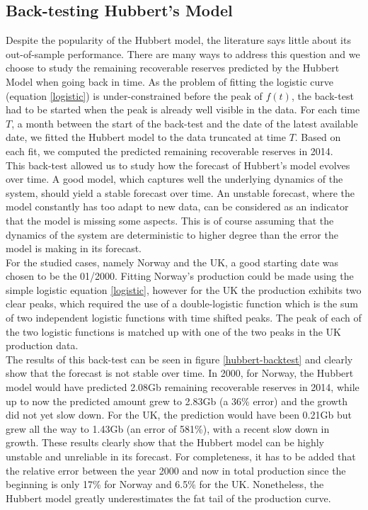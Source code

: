 \documentclass[review]{elsarticle}
\begin{document}
\subsection{Back-testing Hubbert's Model}

Despite the popularity of the Hubbert model, the literature says little about its out-of-sample performance. There are many ways to address this question and we choose to study the remaining recoverable reserves predicted by the Hubbert Model when going back in time. As the problem of fitting the logistic curve (equation \ref{logistic}) is under-constrained before the peak of $f(t)$, the back-test had to be started when the peak is already well visible in the data. For each time $T$, a month between the start of the back-test and the date of the latest available date, we fitted the Hubbert model to the data truncated at time $T$. Based on each fit, we computed the predicted remaining recoverable reserves in 2014.\\
This back-test allowed us to study how the forecast of Hubbert's model evolves over time. A good model, which captures well the underlying dynamics of the system, should yield a stable forecast over time. An unstable forecast, where the model constantly has too adapt to new data, can be considered as an indicator that the model is missing some aspects. This is of course assuming that the dynamics of the system are deterministic to higher degree than the error the model is making in its forecast.\\
For the studied cases, namely Norway and the UK, a good starting date was chosen to be the 01/2000. Fitting Norway's production could be made using the simple logistic equation \ref{logistic}, however for the UK the production exhibits two clear peaks, which required the use of a double-logistic function which is the sum of two independent logistic functions with time shifted peaks. The peak of each of the two logistic functions is matched up with one of the two peaks in the UK production data.\\
The results of this back-test can be seen in figure \ref{hubbert-backtest} and clearly show that the forecast is not stable over time. In 2000, for Norway, the Hubbert model would have predicted 2.08Gb remaining recoverable reserves in 2014, while up to now the predicted amount grew to 2.83Gb (a 36\% error) and the growth did not yet slow down. For the UK, the prediction would have been 0.21Gb but grew all the way to 1.43Gb (an error of 581\%), with a recent slow down in growth. These results clearly show that the Hubbert model can be highly unstable and unreliable in its forecast. For completeness, it has to be added that the relative error between the year 2000 and now in total production since the beginning is only 17\% for Norway and 6.5\% for the UK. Nonetheless, the Hubbert model greatly underestimates the fat tail of the production curve.\\
\end{document}
